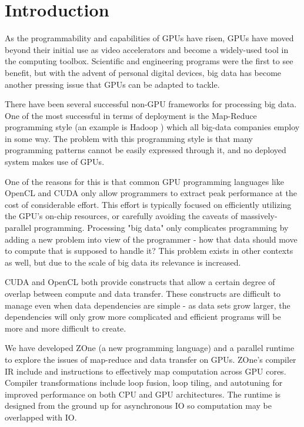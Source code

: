 \section{Introduction}

As the programmability and capabilities of GPUs have risen, GPUs have moved
beyond their initial use as video accelerators and become a widely-used tool
in the computing toolbox. Scientific and engineering programs were the first
to see benefit, but with the advent of personal digital devices, big data has
become another pressing issue that GPUs can be adapted to tackle.

There have been several successful non-GPU frameworks for processing big data.
One of the most successful in terms of deployment is the
Map-Reduce\cite{MapReduce} programming style (an example is Hadoop
\cite{Hadoop}) which
all big-data companies employ in some way. The problem with this
programming style is that many programming patterns cannot be easily
expressed through it, and no deployed system makes use of GPUs.

One of the reasons for this is that common GPU programming languages like
OpenCL and CUDA only allow programmers to extract peak performance
at the cost of
considerable effort. This effort is typically focused on efficiently
utilizing the GPU's
on-chip resources, or carefully avoiding the caveats of massively-parallel
programming. Processing "big data" only complicates programming by adding
a new problem into view of the
programmer - how that data should move to compute that is supposed to
handle it? This problem exists in other contexts as well, but due to the scale
of big data its relevance is increased.

CUDA and OpenCL both provide constructs that allow a certain degree of
overlap between compute and data transfer. These constructs are difficult to
manage even when data dependencies are simple - as data sets grow larger, the
dependencies will only grow more complicated and efficient programs will be
more and more difficult to create.

We have developed ZOne (a new programming language) and a parallel runtime
to explore the issues of map-reduce and data transfer on GPUs.
ZOne's compiler IR include  and 
 instructions to effectively map computation across
GPU cores. Compiler transformations include loop fusion,
loop tiling, and autotuning for improved performance on both CPU
and GPU architectures. The runtime is designed from the ground up
for asynchronous IO so computation may be overlapped with IO.
